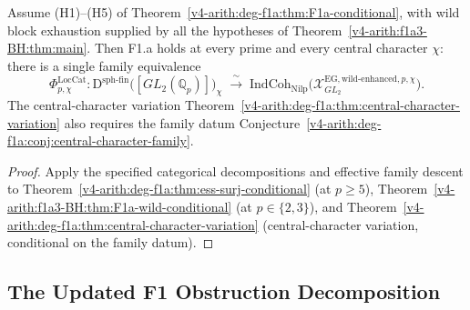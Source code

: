 \begin{corollary}
\label{v4-arith:f1a3-BH:cor:F1a-all-primes-sharpened}
Assume (H1)--(H5) of
Theorem~\ref{v4-arith:deg-f1a:thm:F1a-conditional}, with wild block
exhaustion supplied by all the hypotheses of
Theorem~\ref{v4-arith:f1a3-BH:thm:main}. Then
F1.a holds at every prime and every central character \(\chi\): there is
a single family equivalence
\[
\Phi^{\mathrm{LocCat}}_{p,\chi}\colon
\mathrm{D}^{\mathrm{sph\text{-}fin}}\bigl([GL_{2}(\mathbb{Q}_{p})]\bigr)_{\chi}
\;\xrightarrow{\;\sim\;}\;
\mathrm{IndCoh}_{\mathrm{Nilp}}\bigl(\mathcal{X}^{\mathrm{EG,wild\text{-}enhanced},p,\chi}_{GL_{2}}\bigr).
\]
The central-character variation
Theorem~\ref{v4-arith:deg-f1a:thm:central-character-variation} also requires
the family datum
Conjecture~\ref{v4-arith:deg-f1a:conj:central-character-family}.
\end{corollary}

\begin{proof}
Apply the specified categorical decompositions and effective family
descent to
Theorem~\ref{v4-arith:deg-f1a:thm:ess-surj-conditional} (at \(p\geq 5\)),
Theorem~\ref{v4-arith:f1a3-BH:thm:F1a-wild-conditional} (at \(p\in\{2,3\}\)),
and Theorem~\ref{v4-arith:deg-f1a:thm:central-character-variation}
(central-character variation, conditional on the family datum).
\end{proof}

\subsection{The Updated F1 Obstruction Decomposition}

